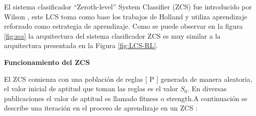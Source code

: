 \documentclass[11pt,fleqn]{book} %
\begin{document}
El sistema clasificador “Zeroth-level” System Classifier (ZCS) fue introducido por Wilson \cite{wilste_zcs}, este LCS toma como base los trabajos de Holland y utiliza aprendizaje reforzado como estrategia de aprendizaje. Como se puede observar en la figura \ref{fig:zcs} la arquitectura del sistema clasificador ZCS es muy similar a la arquitectura presentada en la Figura \ref{fig:LCS-RL}. 

\textbf{Funcionamiento del ZCS}

El ZCS comienza con una población de reglas [ P ] generada de manera aleatoria, el valor inicial de aptitud que toman las reglas es el valor $S_0$. En diversas publicaciones el valor de aptitud es llamado fitness o strength.A continuación se describe una iteración en el proceso de aprendizaje en un ZCS \cite{cadrik_zcs}:
\end{document}
